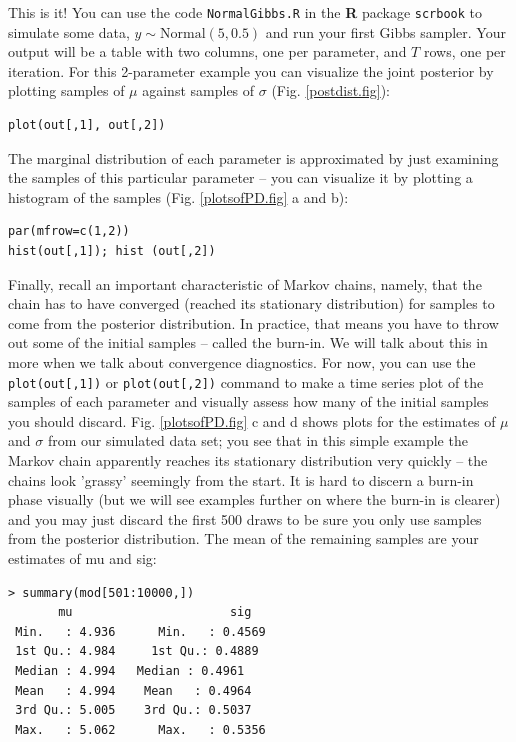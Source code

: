 This is it! You can use the code \mbox{\tt NormalGibbs.R} in the {\bf
  R} package \mbox{\tt scrbook}
to simulate some data, $y \sim \mbox{Normal}(5, 0.5)$ and run your first
Gibbs sampler. Your output will be a table with two columns, one per
parameter, and $T$ rows, one per iteration. For this 2-parameter example
you can visualize the joint posterior by plotting samples of $\mu$
against samples of $\sigma$ (Fig. \ref{postdist.fig}):
\begin{verbatim}
plot(out[,1], out[,2])
\end{verbatim}
The marginal distribution of each parameter is approximated by just
examining the samples of this particular parameter – you can visualize
it by plotting a histogram of the samples (Fig. \ref{plotsofPD.fig} a and b):
\begin{verbatim}
par(mfrow=c(1,2))
hist(out[,1]); hist (out[,2])
\end{verbatim}

Finally, recall an important characteristic of Markov chains, namely,
that the chain has to have converged (reached its stationary
distribution) for samples to come from the posterior distribution. In
practice, that means you have to throw out some of the initial samples
– called the burn-in. We will talk about this in more when we talk
about convergence diagnostics. For now, you can use the
\verb#plot(out[,1])# or \verb#plot(out[,2])# command to make a time
series plot of the samples of each parameter and visually assess how
many of the initial samples you should discard. Fig. \ref{plotsofPD.fig} c and d shows
plots for the estimates of $\mu$ and $\sigma$ from our simulated data set;
you see that in this simple example the Markov chain apparently
reaches its stationary distribution very quickly – the chains look
'grassy' seemingly from the start. It is hard to discern a burn-in
phase visually (but we will see examples further on where the burn-in
is clearer) and you may just discard the first 500 draws to be sure
you only use samples from the posterior distribution. The mean of the
remaining samples are your estimates of mu and sig:
\begin{verbatim}
> summary(mod[501:10000,])
       mu                      sig
 Min.   : 4.936      Min.   : 0.4569
 1st Qu.: 4.984     1st Qu.: 0.4889
 Median : 4.994   Median : 0.4961
 Mean   : 4.994    Mean   : 0.4964
 3rd Qu.: 5.005    3rd Qu.: 0.5037
 Max.   : 5.062      Max.   : 0.5356
\end{verbatim}

